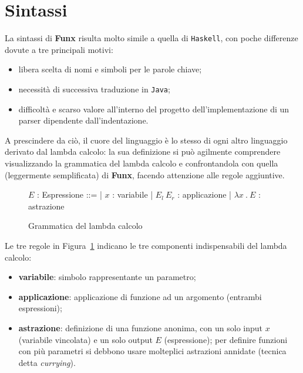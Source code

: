 \section{Sintassi}
\label{sec:2-3-syntax}

La sintassi di \textbf{Funx} risulta molto simile a quella di \texttt{Haskell}, con poche differenze dovute
a tre principali motivi:
\begin{itemize}
    \item libera scelta di nomi e simboli per le parole chiave;
    \item necessità di successiva traduzione in \texttt{Java};
    \item difficoltà e scarso valore all'interno del progetto dell'implementazione di un parser dipendente dall'indentazione.
\end{itemize}

\noindent A prescindere da ciò, il cuore del linguaggio è lo stesso di ogni altro linguaggio derivato dal lambda calcolo:
la sua definizione si può agilmente comprendere visualizzando la grammatica del lambda calcolo e confrontandola con
quella (leggermente semplificata) di \textbf{Funx}, facendo attenzione alle regole aggiuntive.

\begin{figure}
    \vspace{4mm}
    \begin{bnf}
        $E$ : \small{Espressione} ::=
        | $x$ : \small{variabile}
        | $E_l\ E_r$ : \small{applicazione}
        | $\lambda x\ .\ E$ : \small{astrazione}
    \end{bnf}
    \caption{Grammatica del lambda calcolo}
    \label{fig:2-3-lambda-syntax}
    \vspace{4mm}
\end{figure}

\noindent Le tre regole in Figura~\ref{fig:2-3-lambda-syntax} indicano le tre componenti indispensabili
del lambda calcolo:
\begin{itemize}
    \item \textbf{variabile}: simbolo rappresentante un parametro;
    \item \textbf{applicazione}: applicazione di funzione ad un argomento (entrambi espressioni);
    \item \textbf{astrazione}: definizione di una funzione anonima, con un solo input $x$ (variabile vincolata)
          e un solo output $E$ (espressione); per definire funzioni con più
          parametri si debbono usare molteplici astrazioni annidate (tecnica detta \textit{currying}).
\end{itemize}

